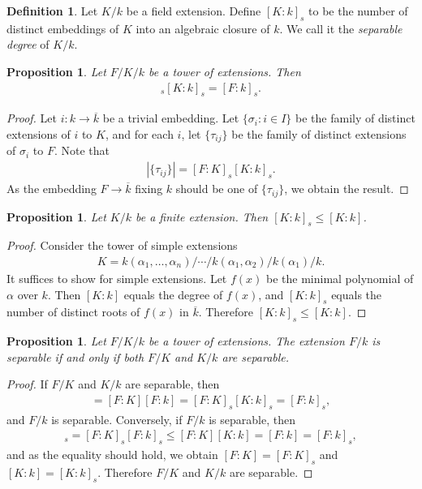 \documentclass[12pt]{report}
\theoremstyle{plain}
\newtheorem{proposition}[theorem]{Proposition}
\theoremstyle{remark}
\theoremstyle{definition}
\newtheorem{definition}[theorem]{Definition}
\begin{document}
\begin{definition}
    Let $K/k$ be a field extension. Define $[K:k]_s$ to be the number of distinct embeddings of $K$ into an algebraic closure of $k$. We call it the \emph{separable degree} of $K/k$.
\end{definition}

\begin{proposition}
    Let $F/K/k$ be a tower of extensions. Then
    \begin{align*}
        [F:K]_s[K:k]_s=[F:k]_s.
    \end{align*}
\end{proposition}
\begin{proof}
    Let $i:k\rightarrow\overline{k}$ be a trivial embedding. Let $\{\sigma_i:i\in I\}$ be the family of distinct extensions of $i$ to $K$, and for each $i$, let $\{\tau_{ij}\}$ be the family of distinct extensions of $\sigma_i$ to $F$. Note that
    \begin{align*}
        |\{\tau_{ij}\}|=[F:K]_s[K:k]_s.
    \end{align*}
    As the embedding $F\rightarrow\overline{k}$ fixing $k$ should be one of $\{\tau_{ij}\}$, we obtain the result.
\end{proof}

\begin{proposition}
    Let $K/k$ be a finite extension. Then $[K:k]_s\le [K:k]$.
\end{proposition}
\begin{proof}
    Consider the tower of simple extensions
    \begin{align*}
        K=k(\alpha_1,\dots,\alpha_n)/\cdots/ k(\alpha_1,\alpha_2)/k(\alpha_1)/k.
    \end{align*}
    It suffices to show for simple extensions. Let $f(x)$ be the minimal polynomial of $\alpha$ over $k$. Then $[K:k]$ equals the degree of $f(x)$, and $[K:k]_s$ equals the number of distinct roots of $f(x)$ in $\overline{k}$. Therefore $[K:k]_s\le [K:k]$.
\end{proof}

\begin{proposition}
    Let $F/K/k$ be a tower of extensions. The extension $F/k$ is separable if and only if both $F/K$ and $K/k$ are separable.
\end{proposition}
\begin{proof}
    If $F/K$ and $K/k$ are separable, then
    \begin{align*}
        [F:k]=[F:K][F:k]=[F:K]_s[K:k]_s=[F:k]_s,
    \end{align*}
    and $F/k$ is separable. Conversely, if $F/k$ is separable, then
    \begin{align*}
        [F:k]_s=[F:K]_s[F:k]_s\le [F:K][K:k]=[F:k]=[F:k]_s,
    \end{align*}
    and as the equality should hold, we obtain $[F:K]=[F:K]_s$ and $[K:k]=[K:k]_s$. Therefore $F/K$ and $K/k$ are separable.
\end{proof}
\end{document}
